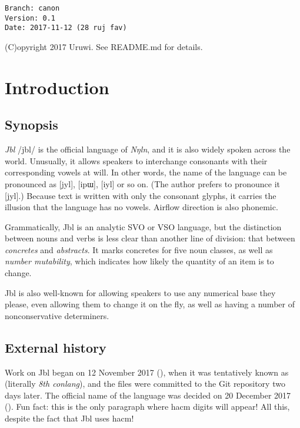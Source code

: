 \documentclass{book}
\newcommand{\lname}{Jbl}
\begin{document}
\begin{verbatim}
Branch: canon
Version: 0.1
Date: 2017-11-12 (28 ruj fav)
\end{verbatim}

(C)opyright 2017 Uruwi. See README.md for details.

\tableofcontents

\section{Introduction}

\subsection{Synopsis}

\emph{\lname} /jbl/ is the official language of \emph{Nŋln}, and it is also widely spoken across the world. Unusually, it allows speakers to interchange consonants with their corresponding vowels at will. In other words, the name of the language can be pronounced as [jyl], [ipɯ], [iyl] or so on. (The author prefers to pronounce it [jyl].) Because text is written with only the consonant glyphs, it carries the illusion that the language has no vowels. Airflow direction is also phonemic.

Grammatically, \lname{} is an analytic SVO or VSO language, but the distinction between nouns and verbs is less clear than another line of division: that between \emph{concretes} and \emph{abstracts}. It marks concretes for five noun classes, as well as \emph{number mutability}, which indicates how likely the quantity of an item is to change.

\lname{} is also well-known for allowing speakers to use any numerical base they please, even allowing them to change it on the fly, as well as having a number of nonconservative determiners.

\subsection{External history}

Work on \lname{} began on 12 November 2017 (), when it was tentatively known as  (literally \emph{8th conlang}), and the files were committed to the Git repository two days later. The official name of the language was decided on 20 December 2017 (). Fun fact: this is the only paragraph where hacm digits will appear! All this, despite the fact that \lname{} uses hacm!
\end{document}
